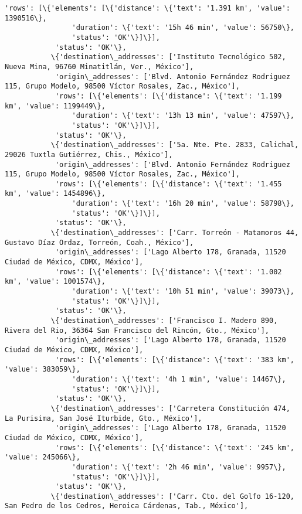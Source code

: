 \documentclass[11pt]{article}
\begin{document}
\begin{Verbatim}[commandchars=\\\{\}]
            'rows': [\{'elements': [\{'distance': \{'text': '1.391 km', 'value': 1390516\},
                'duration': \{'text': '15h 46 min', 'value': 56750\},
                'status': 'OK'\}]\}],
            'status': 'OK'\},
           \{'destination\_addresses': ['Instituto Tecnológico 502, Nueva Mina, 96760 Minatitlán, Ver., México'],
            'origin\_addresses': ['Blvd. Antonio Fernández Rodriguez 115, Grupo Modelo, 98500 Víctor Rosales, Zac., México'],
            'rows': [\{'elements': [\{'distance': \{'text': '1.199 km', 'value': 1199449\},
                'duration': \{'text': '13h 13 min', 'value': 47597\},
                'status': 'OK'\}]\}],
            'status': 'OK'\},
           \{'destination\_addresses': ['5a. Nte. Pte. 2833, Calichal, 29026 Tuxtla Gutiérrez, Chis., México'],
            'origin\_addresses': ['Blvd. Antonio Fernández Rodriguez 115, Grupo Modelo, 98500 Víctor Rosales, Zac., México'],
            'rows': [\{'elements': [\{'distance': \{'text': '1.455 km', 'value': 1454896\},
                'duration': \{'text': '16h 20 min', 'value': 58798\},
                'status': 'OK'\}]\}],
            'status': 'OK'\},
           \{'destination\_addresses': ['Carr. Torreón - Matamoros 44, Gustavo Díaz Ordaz, Torreón, Coah., México'],
            'origin\_addresses': ['Lago Alberto 178, Granada, 11520 Ciudad de México, CDMX, México'],
            'rows': [\{'elements': [\{'distance': \{'text': '1.002 km', 'value': 1001574\},
                'duration': \{'text': '10h 51 min', 'value': 39073\},
                'status': 'OK'\}]\}],
            'status': 'OK'\},
           \{'destination\_addresses': ['Francisco I. Madero 890, Rivera del Rio, 36364 San Francisco del Rincón, Gto., México'],
            'origin\_addresses': ['Lago Alberto 178, Granada, 11520 Ciudad de México, CDMX, México'],
            'rows': [\{'elements': [\{'distance': \{'text': '383 km', 'value': 383059\},
                'duration': \{'text': '4h 1 min', 'value': 14467\},
                'status': 'OK'\}]\}],
            'status': 'OK'\},
           \{'destination\_addresses': ['Carretera Constitución 474, La Purisima, San José Iturbide, Gto., México'],
            'origin\_addresses': ['Lago Alberto 178, Granada, 11520 Ciudad de México, CDMX, México'],
            'rows': [\{'elements': [\{'distance': \{'text': '245 km', 'value': 245066\},
                'duration': \{'text': '2h 46 min', 'value': 9957\},
                'status': 'OK'\}]\}],
            'status': 'OK'\},
           \{'destination\_addresses': ['Carr. Cto. del Golfo 16-120, San Pedro de los Cedros, Heroica Cárdenas, Tab., México'],

\end{Verbatim}
\end{document}
